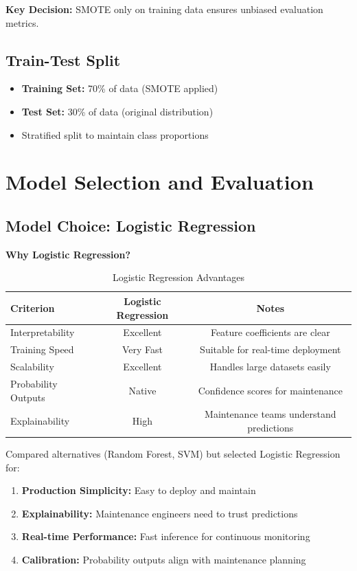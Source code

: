 \documentclass[11pt,a4paper]{article}
\begin{document}
\textbf{Key Decision:} SMOTE only on training data ensures unbiased evaluation metrics.

\subsection{Train-Test Split}
\begin{itemize}
    \item \textbf{Training Set:} 70\% of data (SMOTE applied)
    \item \textbf{Test Set:} 30\% of data (original distribution)
    \item Stratified split to maintain class proportions
\end{itemize}

\section{Model Selection and Evaluation}

\subsection{Model Choice: Logistic Regression}

\textbf{Why Logistic Regression?}
\begin{table}[H]
\centering
\begin{tabular}{|l|c|c|}
\toprule
\textbf{Criterion} & \textbf{Logistic Regression} & \textbf{Notes} \\
\midrule
Interpretability & Excellent & Feature coefficients are clear \\
Training Speed & Very Fast & Suitable for real-time deployment \\
Scalability & Excellent & Handles large datasets easily \\
Probability Outputs & Native & Confidence scores for maintenance \\
Explainability & High & Maintenance teams understand predictions \\
\bottomrule
\end{tabular}
\caption{Logistic Regression Advantages}
\end{table}

Compared alternatives (Random Forest, SVM) but selected Logistic Regression for:
\begin{enumerate}
    \item \textbf{Production Simplicity:} Easy to deploy and maintain
    \item \textbf{Explainability:} Maintenance engineers need to trust predictions
    \item \textbf{Real-time Performance:} Fast inference for continuous monitoring
    \item \textbf{Calibration:} Probability outputs align with maintenance planning
\end{enumerate}
\end{document}

